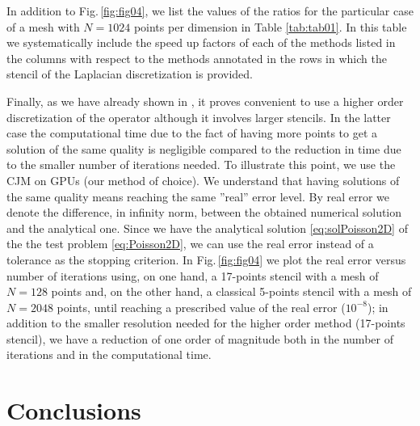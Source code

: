 \documentclass[preprint,12pt]{elsarticle}
\begin{document}
In addition to Fig.\,\ref{fig:fig04}, we list the values
of the ratios for the particular case of a mesh with
$N=1024$ points per dimension in Table \ref{tab:tab01}. In this table we systematically
  include the speed up factors of each of the methods listed in the
  columns with respect to the methods annotated in the rows in which
  the stencil of the Laplacian discretization is provided.


Finally, as we have already shown in \cite{Adsuara2017446}, it proves
convenient to use a higher order discretization of the operator
although it involves larger
  stencils. In the latter case the computational time due to the fact
of having more points to get a solution of the
same quality is negligible compared to the reduction in time due to
the smaller number of iterations needed. To illustrate this point, we
use the CJM on GPUs (our
method of choice). We
  understand that having solutions of the same quality means
reaching the same ''real''
error level.  By real error we denote the difference, in
infinity norm, between the obtained numerical solution and the
analytical one. Since we have the analytical solution
\eqref{eq:solPoisson2D} of the the test problem \eqref{eq:Poisson2D},
we can use the real error instead of a tolerance as the stopping
criterion. In Fig.\,\ref{fig:fig04} we plot the real error versus
number of iterations using, on one hand, a 17-points stencil with a
mesh of $N=128$ points and, on the other hand, a
classical 5-points stencil with a mesh of
$N=2048$ points, until reaching a prescribed
value of the real error ($10^{-8}$); in addition to the smaller
resolution needed for the higher order method (17-points stencil), we
have a reduction of one order of magnitude both in the
number of iterations and in the computational
time.


\section{Conclusions}
\label{sec:con}
\end{document}
